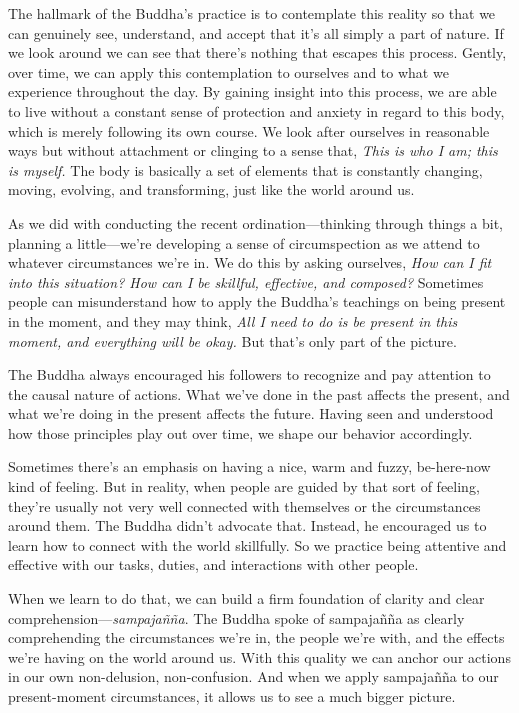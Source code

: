 The hallmark of the Buddha's practice is to contemplate this reality so 
that we can genuinely see, understand, and accept that it's all simply 
a part of nature. If we look around we can see that there's nothing 
that escapes this process. Gently, over time, we can apply this 
contemplation to ourselves and to what we experience throughout the 
day. By gaining insight into this process, we are able to live without 
a constant sense of protection and anxiety in regard to this body, 
which is merely following its own course. We look after ourselves in 
reasonable ways but without attachment or clinging to a sense that, 
\emph{This is who I am; this is myself.} The body is basically a set of 
elements that is constantly changing, moving, evolving, and 
transforming, just like the world around us.


As we did with conducting the recent ordination---thinking through 
things a bit, planning a little---we're developing a sense of 
circumspection as we attend to whatever circumstances we're in. We do 
this by asking ourselves, \emph{How can I fit into this situation? How 
can I be skillful, effective, and composed?} Sometimes people can 
misunderstand how to apply the Buddha's teachings on being present in 
the moment, and they may think, \emph{All I need to do is be present in 
this moment, and everything will be okay.} But that's only part of the 
picture.

The Buddha always encouraged his followers to recognize and pay 
attention to the causal nature of actions. What we've done in the past 
affects the present, and what we're doing in the present affects the 
future. Having seen and understood how those principles play out over 
time, we shape our behavior accordingly.

Sometimes there's an emphasis on having a nice, warm and fuzzy, 
be-here-now kind of feeling. But in reality, when people are guided by 
that sort of feeling, they're usually not very well connected with 
themselves or the circumstances around them. The Buddha didn't advocate 
that. Instead, he encouraged us to learn how to connect with the world 
skillfully. So we practice being attentive and effective with our 
tasks, duties, and interactions with other people.

When we learn to do that, we can build a firm foundation of clarity and 
clear comprehension---\emph{sampajañña}. The Buddha spoke of 
sampajañña as clearly comprehending the circumstances we're in, the 
people we're with, and the effects we're having on the world around us. 
With this quality we can anchor our actions in our own non-delusion, 
non-confusion. And when we apply sampajañña to our present-moment 
circumstances, it allows us to see a much bigger picture.

